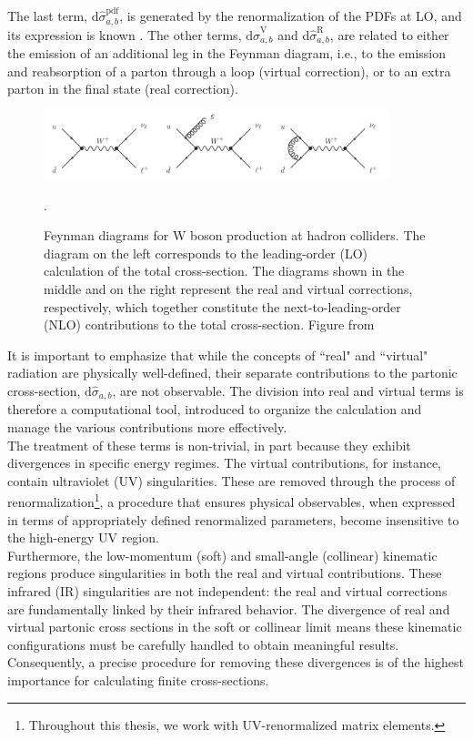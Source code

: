 \documentclass[a4paper, 12pt]{book}
\begin{document}
The last term, $\mathrm{d} \hat{\sigma}_{a,b}^{\mathrm{pdf}}$, is generated by the renormalization of the PDFs at LO, and its expression is known \cite{Catani:1996vz}. The other terms, $\mathrm{d} \hat{\sigma}_{a,b}^{\mathrm{V}}$ and $\mathrm{d} \hat{\sigma}_{a,b}^{\mathrm{R}}$, are related to either the emission of an additional leg in the Feynman diagram, i.e., to the emission and reabsorption of a parton through a loop (virtual correction), or to an extra parton in the final state (real correction).\par\bigskip
\begin{figure}[!ht]
	\centering
	\includegraphics[width=0.9\textwidth]{imgs/real-and-virtual.png}
	\caption{Feynman diagrams for W boson production at hadron colliders. The diagram on the left corresponds to the leading-order (LO) calculation of the total cross-section. The diagrams shown in the middle and on the right represent the real and virtual corrections, respectively, which together constitute the next-to-leading-order (NLO) contributions to the total cross-section. Figure from \cite{Campbell:2017}}.
	\label{hadron-collision}
\end{figure}
It is important to emphasize that while the concepts of ``real" and ``virtual" radiation are physically well-defined, their separate contributions to the partonic cross-section, $\mathrm{d}\hat{\sigma}_{a,b}$, are not observable. The division into real and virtual terms is therefore a computational tool, introduced to organize the calculation and manage the various contributions more effectively. \\ The treatment of these terms is non-trivial, in part because they exhibit divergences in specific energy regimes. The virtual contributions, for instance, contain ultraviolet (UV) singularities. These are removed through the process of renormalization\footnote{Throughout this thesis, we work with UV-renormalized matrix elements.}, a procedure that ensures physical observables, when expressed in terms of appropriately defined renormalized parameters, become insensitive to the high-energy UV region. \\ Furthermore, the low-momentum (soft) and small-angle (collinear) kinematic regions produce singularities in both the real and virtual contributions. These infrared (IR) singularities are not independent: the real and virtual corrections are fundamentally linked by their infrared behavior. The divergence of real and virtual partonic cross sections in the soft or collinear limit means these kinematic configurations must be carefully handled to obtain meaningful results. Consequently, a precise procedure for removing these divergences is of the highest importance for calculating finite cross-sections.
\end{document}
